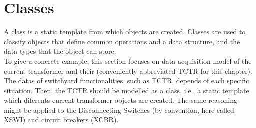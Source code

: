 \section{Classes}

A class is a static 
template from which objects are 
created. Classes are used 
to classify objects  
that define 
common operations 
and a data structure, 
and the data types
that the object can 
store.\\

To give a concrete example, this section 
focuses on data acquisition model of 
the current transformer and their 
(conveniently abbreviated TCTR 
for this chapter). 
The datas of switchyard functionalities, 
such as {TCTR}, depends of 
each specific situation. Then, 
the {TCTR} should be modelled as 
a class, i.e., a static template  
which diferents current transformer objects 
are created. The same reasoning might be 
applied to the Disconnecting Switches 
(by convention, here called {XSWI})
and circuit breakers ({XCBR}).


%



\\



\\ 







%


